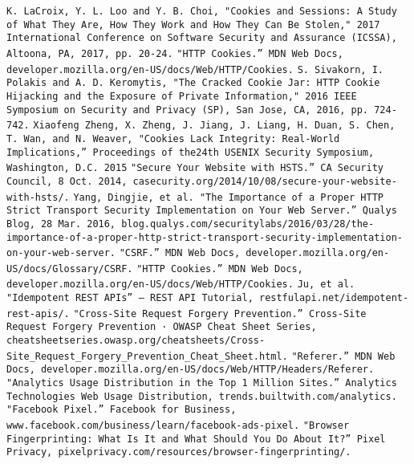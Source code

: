 \documentclass[conference,12pt]{IEEEtran}
\begin{document}
\begin{thebibliography}{00}
 \lstinline{K. LaCroix, Y. L. Loo and Y. B. Choi, "Cookies and Sessions: A Study of What They Are, How They Work and How They Can Be Stolen," 2017 International Conference on Software Security and Assurance (ICSSA), Altoona, PA, 2017, pp. 20-24.}
 \lstinline{"HTTP Cookies.” MDN Web Docs, developer.mozilla.org/en-US/docs/Web/HTTP/Cookies.}
 \lstinline{S. Sivakorn, I. Polakis and A. D. Keromytis, "The Cracked Cookie Jar: HTTP Cookie Hijacking and the Exposure of Private Information," 2016 IEEE Symposium on Security and Privacy (SP), San Jose, CA, 2016, pp. 724-742.}
 \lstinline{Xiaofeng Zheng, X. Zheng, J. Jiang, J. Liang, H. Duan, S. Chen, T. Wan, and N. Weaver, "Cookies Lack Integrity: Real-World Implications,” Proceedings of the24th USENIX Security Symposium, Washington, D.C. 2015}
 \lstinline{"Secure Your Website with HSTS.” CA Security Council, 8 Oct. 2014, casecurity.org/2014/10/08/secure-your-website-with-hsts/.}
 \lstinline{Yang, Dingjie, et al. "The Importance of a Proper HTTP Strict Transport Security Implementation on Your Web Server.” Qualys Blog, 28 Mar. 2016, blog.qualys.com/securitylabs/2016/03/28/the-importance-of-a-proper-http-strict-transport-security-implementation-on-your-web-server.}
 \lstinline{"CSRF.” MDN Web Docs, developer.mozilla.org/en-US/docs/Glossary/CSRF.}
 \lstinline{"HTTP Cookies.” MDN Web Docs, developer.mozilla.org/en-US/docs/Web/HTTP/Cookies.}
 \lstinline{Ju, et al. "Idempotent REST APIs” – REST API Tutorial, restfulapi.net/idempotent-rest-apis/.}
 \lstinline{"Cross-Site Request Forgery Prevention.” Cross-Site Request Forgery Prevention · OWASP Cheat Sheet Series, cheatsheetseries.owasp.org/cheatsheets/Cross-Site_Request_Forgery_Prevention_Cheat_Sheet.html.}
 \lstinline{"Referer.” MDN Web Docs, developer.mozilla.org/en-US/docs/Web/HTTP/Headers/Referer.}
 \lstinline{"Analytics Usage Distribution in the Top 1 Million Sites.” Analytics Technologies Web Usage Distribution, trends.builtwith.com/analytics.}
 \lstinline{"Facebook Pixel.” Facebook for Business, www.facebook.com/business/learn/facebook-ads-pixel.}
 \lstinline{"Browser Fingerprinting: What Is It and What Should You Do About It?” Pixel Privacy, pixelprivacy.com/resources/browser-fingerprinting/.}
\end{thebibliography}
\vspace{12pt}
\end{document}
